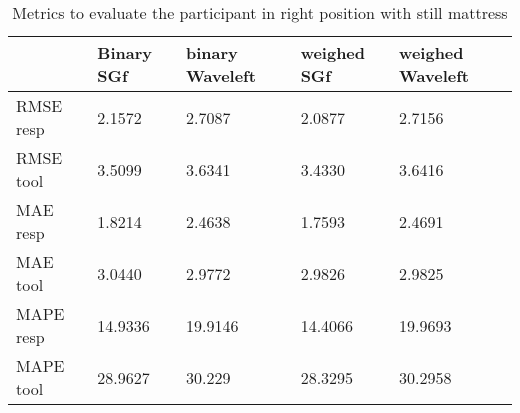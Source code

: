 \begin{table}\begin{tabular}{|lllll|}
\hline 
& Binary SGf & binary Waveleft & weighed  SGf & weighed Waveleft \\ 
\hline 
RMSE resp &
     2.1572  &  2.7087  &  2.0877  &  2.7156 \\
RMSE  tool &    3.5099  &   3.6341   & 3.4330 &   3.6416 \\
MAE resp & 1.8214 &   2.4638 &     1.7593 &  2.4691 \\ 
MAE tool &     3.0440 & 2.9772 & 2.9826 &  2.9825 \\
MAPE resp & 14.9336 & 19.9146 & 14.4066 & 19.9693 \\ 
MAPE tool & 28.9627 & 30.229 & 28.3295 & 30.2958 \\ 
\hline 
\end{tabular}

\caption{Metrics to evaluate the participant in right position with still mattress}
\end{table}
